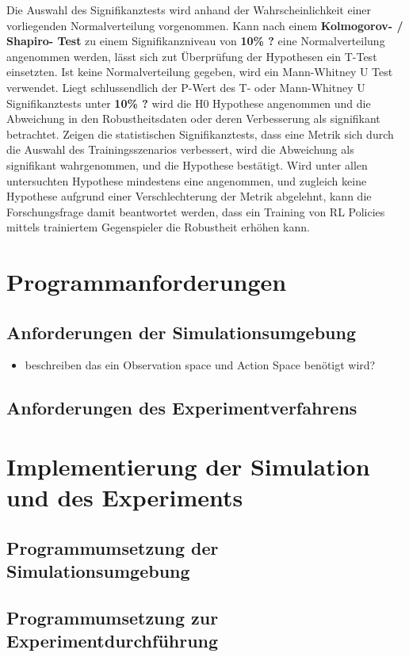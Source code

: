 Die Auswahl des Signifikanztests wird anhand der Wahrscheinlichkeit einer vorliegenden Normalverteilung vorgenommen.
Kann nach einem \textbf{Kolmogorov- / Shapiro- Test} zu einem Signifikanzniveau von \textbf{10\% ?} eine Normalverteilung angenommen werden, lässt sich zut Überprüfung der Hypothesen ein T-Test einsetzten.
Ist keine Normalverteilung gegeben, wird ein Mann-Whitney U Test verwendet.
Liegt schlussendlich der P-Wert des T- oder Mann-Whitney U Signifikanztests unter \textbf{10\% ?} wird die H0 Hypothese angenommen und die Abweichung in den Robustheitsdaten oder deren Verbesserung als signifikant betrachtet.
Zeigen die statistischen Signifikanztests, dass eine Metrik sich durch die Auswahl des Trainingsszenarios verbessert, wird die Abweichung als signifikant wahrgenommen, und die Hypothese bestätigt.
Wird unter allen untersuchten Hypothese mindestens eine angenommen, und zugleich keine Hypothese aufgrund einer Verschlechterung der Metrik abgelehnt, kann die Forschungsfrage damit beantwortet werden, dass ein Training von RL Policies mittels trainiertem Gegenspieler die Robustheit erhöhen kann.

\section{Programmanforderungen}
\subsection{Anforderungen der Simulationsumgebung}
\begin{itemize}
    \item beschreiben das ein Observation space und Action Space benötigt wird?
\end{itemize}

\subsection{Anforderungen des Experimentverfahrens}

\section{Implementierung der Simulation und des Experiments}
\subsection{Programmumsetzung der Simulationsumgebung}
\subsection{Programmumsetzung zur Experimentdurchführung}